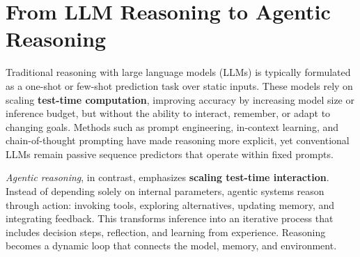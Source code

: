 \section{From LLM Reasoning to Agentic Reasoning}
\label{sec:from}

Traditional reasoning with large language models (LLMs) is typically formulated as a one-shot or few-shot prediction task over static inputs. These models rely on scaling \textbf{test-time computation}, improving accuracy by increasing model size or inference budget, but without the ability to interact, remember, or adapt to changing goals. Methods such as prompt engineering, in-context learning, and chain-of-thought prompting have made reasoning more explicit, yet conventional LLMs remain passive sequence predictors that operate within fixed prompts.

\emph{Agentic reasoning}, in contrast, emphasizes \textbf{scaling test-time interaction}. Instead of depending solely on internal parameters, agentic systems reason through action: invoking tools, exploring alternatives, updating memory, and integrating feedback. This transforms inference into an iterative process that includes decision steps, reflection, and learning from experience. Reasoning becomes a dynamic loop that connects the model, memory, and environment.


